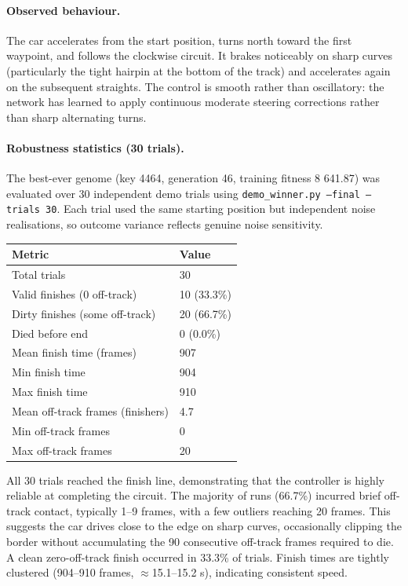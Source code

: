 \documentclass[a4paper]{article}
\begin{document}
\paragraph{Observed behaviour.}
The car accelerates from the start position, turns north toward the
first waypoint, and follows the clockwise circuit.
It brakes noticeably on sharp curves (particularly the tight hairpin
at the bottom of the track) and accelerates again on the subsequent
straights.
The control is smooth rather than oscillatory: the network has learned
to apply continuous moderate steering corrections rather than sharp
alternating turns.

\paragraph{Robustness statistics (30 trials).}
The best-ever genome (key 4464, generation 46, training fitness
8 641.87) was evaluated over 30 independent demo trials using
\texttt{demo\_winner.py --final --trials 30}.
Each trial used the same starting position but independent noise
realisations, so outcome variance reflects genuine noise sensitivity.

\begin{center}
\begin{tabular}{ll}
\toprule
\textbf{Metric} & \textbf{Value} \\ \midrule
Total trials                & 30 \\
Valid finishes (0 off-track)& 10 (33.3\%) \\
Dirty finishes (some off-track) & 20 (66.7\%) \\
Died before end             & 0 (0.0\%) \\
Mean finish time (frames)   & 907 \\
Min finish time             & 904 \\
Max finish time             & 910 \\
Mean off-track frames (finishers) & 4.7 \\
Min off-track frames        & 0 \\
Max off-track frames        & 20 \\
\bottomrule
\end{tabular}
\end{center}

All 30 trials reached the finish line, demonstrating that the controller
is highly reliable at completing the circuit.
The majority of runs (66.7\%) incurred brief off-track contact,
typically 1--9 frames, with a few outliers reaching 20 frames.
This suggests the car drives close to the edge on sharp curves,
occasionally clipping the border without accumulating the 90 consecutive
off-track frames required to die.
A clean zero-off-track finish occurred in 33.3\% of trials.
Finish times are tightly clustered (904--910 frames, $\approx$15.1--15.2 s),
indicating consistent speed.
\end{document}
